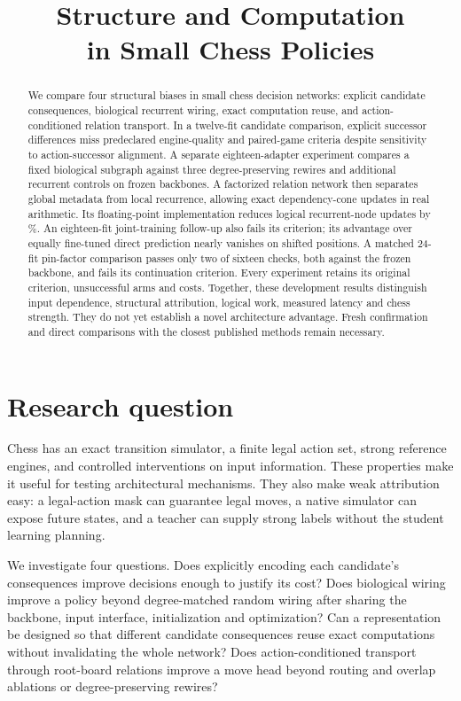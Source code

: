 \documentclass{article}
\title{Structure and Computation\\in Small Chess Policies}
\begin{document}
\maketitle

\begin{abstract}
We compare four structural biases in small chess decision networks: explicit
candidate consequences, biological recurrent wiring, exact computation reuse,
and action-conditioned relation transport. In a twelve-fit candidate comparison,
explicit successor differences miss predeclared engine-quality and paired-game
criteria despite sensitivity to action-successor alignment. A separate
eighteen-adapter experiment compares a fixed biological subgraph against three
degree-preserving rewires and additional recurrent controls on frozen backbones.
\BioAbstract{} A factorized relation network then separates global metadata
from local recurrence, allowing exact dependency-cone updates in real arithmetic.
Its floating-point implementation reduces logical recurrent-node updates by
\LocalSavings\%. \BatchAbstract{} \TransportAbstract{}
An eighteen-fit joint-training follow-up also fails its criterion; its advantage
over equally fine-tuned direct prediction nearly vanishes on shifted positions.
A matched 24-fit pin-factor comparison passes only two of sixteen checks,
both against the frozen backbone, and fails its continuation criterion.
Every experiment retains its original criterion, unsuccessful arms and costs.
Together, these development results distinguish input dependence, structural
attribution, logical work, measured latency and chess strength. They do not yet
establish a novel architecture advantage. Fresh confirmation and direct
comparisons with the closest published methods remain necessary.
\end{abstract}

\section{Research question}
Chess has an exact transition simulator, a finite legal action set, strong
reference engines, and controlled interventions on input information. These
properties make it useful for testing architectural mechanisms. They also make
weak attribution easy: a legal-action mask can guarantee legal moves, a native
simulator can expose future states, and a teacher can supply strong labels
without the student learning planning.

We investigate four questions. Does explicitly encoding each candidate's
consequences improve decisions enough to justify its cost? Does biological
wiring improve a policy beyond degree-matched random wiring after sharing the
backbone, input interface, initialization and optimization? Can a representation
be designed so that different candidate consequences reuse exact computations
without invalidating the whole network? Does action-conditioned transport
through root-board relations improve a move head beyond routing and overlap
ablations or degree-preserving rewires?
\end{document}
